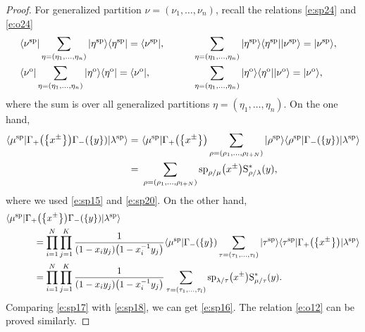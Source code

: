 \documentclass[pdftex]{sigma}
\numberwithin{equation}{section}
\begin{document}
\begin{proof}For generalized partition $\nu=(\nu_1,\dots,\nu_n)$, recall the relations \eqref{e:sp24} and \eqref{e:o24}
\begin{alignat*}{3}
&\langle\nu^{\rm sp}|\sum_{\eta=(\eta_1,\dots,\eta_n)}|\eta^{\rm sp}\rangle\langle\eta^{\rm sp}| = \langle\nu^{\rm sp}|,\qquad&& \sum_{\eta=(\eta_1,\dots,\eta_n)}|\eta^{\rm sp}\rangle\langle\eta^{\rm sp}||\nu^{\rm sp}\rangle = |\nu^{\rm sp}\rangle,&\\
&\langle\nu^{\rm o}|\sum_{\eta=(\eta_1,\dots,\eta_n)}|\eta^{\rm o}\rangle\langle\eta^{\rm o}| = \langle\nu^{\rm o}|,\qquad&& \sum_{\eta=(\eta_1,\dots,\eta_n)}|\eta^{\rm o}\rangle\langle\eta^{\rm o}||\nu^{\rm o}\rangle = |\nu^{\rm o}\rangle,&
\end{alignat*}
where the sum is over all generalized partitions $\eta=(\eta_1,\dots,\eta_n)$.
On the one hand,
\begin{align}\label{e:sp17}
\notag\langle\mu^{\rm sp}|\Gamma_+\big(\big\{x^{\pm}\big\}\big)\Gamma_-(\{y\})|\lambda^{\rm sp}\rangle=~&\langle\mu^{\rm sp}|\Gamma_+\big(\big\{x^{\pm}\big\}\big)\sum_{\rho=(\rho_1,\dots,\rho_{l+N}) }|\rho^{\rm sp}\rangle\langle\rho^{\rm sp}|\Gamma_-(\{y\})|\lambda^{\rm sp}\rangle\\
=~&\sum_{\rho=(\rho_1,\dots,\rho_{l+N})}{\rm sp}_{\rho/\mu}\big(x^{\pm}\big){\rm S}^*_{\rho/\lambda}(y),
\end{align}
where we used \eqref{e:sp15} and \eqref{e:sp20}. On the other hand,
\begin{align}
&\langle\mu^{\rm sp}|\Gamma_+\big(\big\{x^{\pm}\big\}\big)\Gamma_-(\{y\})|\lambda^{\rm sp}\rangle \nonumber\\
&\qquad\quad{}=\prod^N_{i=1}\prod^K_{j=1}\frac{1}{(1-x_iy_j)\big(1-x^{-1}_iy_j\big)}\langle\mu^{\rm sp}|\Gamma_-(\{y\})\sum_{\tau=(\tau_1,\dots,\tau_l) }|\tau^{\rm sp}\rangle\langle\tau^{\rm sp}|\Gamma_+\big(\big\{x^{\pm}\big\}\big)|\lambda^{\rm sp}\rangle \nonumber\\
&\qquad\quad{}=\prod^N_{i=1}\prod^K_{j=1}\frac{1}{(1-x_iy_j)\big(1-x^{-1}_iy_j\big)}\sum_{\tau=(\tau_1,\dots,\tau_l)}{\rm sp}_{\lambda/\tau}\big(x^{\pm}\big){\rm S}^*_{\mu/\tau}(y).\label{e:sp18}
\end{align}
Comparing \eqref{e:sp17} with \eqref{e:sp18}, we can get \eqref{e:sp16}. The relation \eqref{e:o12} can be proved similarly.
\end{proof}
\end{document}

